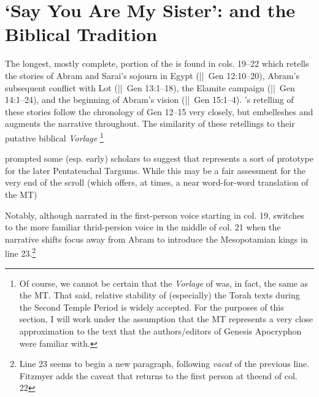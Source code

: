 \section{`Say You Are My Sister': \ga and the Biblical Tradition}

The longest, mostly complete, portion of the \ga is found in cols. 19--22 which retells the stories of Abram and Sarai's sojourn in Egypt (||~Gen 12:10--20), Abram's subsequent conflict with Lot (||~Gen 13:1--18), the Elamite campaign (||~Gen 14:1--24), and the beginning of Abram's vision (||~Gen 15:1--4). \ga's retelling of these stories follow the chronology of Gen 12--15 very closely, but \ga embelleshes and augments the narrative throughout. The similarity of these retellings to their putative biblical \emph{Vorlage}%
%
\footnote{Of course, we cannot be certain that the \emph{Vorlage} of \ga was, in fact, the same as the MT. That said, relative stability of (especially) the Torah texts during the Second Temple Period is widely accepted. For the purposes of this section, I will work under the assumption that the MT represents a very close approximation to the text that the authors/editors of Genesis Apocryphon were familiar with.}

prompted some (esp. early) scholars to suggest that \ga represents a sort of prototype for the later Pentateuchal Targums.\autocite[193]{black1983} While this may be a fair assessment for the very end of the scroll (which offers, at times, a near word-for-word translation of the MT)

Notably, although narrated in the first-person voice starting in col. 19, \ga switches to the more familiar thrid-persion voice in the middle of col. 21 when the narrative shifts focus away from Abram to introduce the Mesopotamian kings in line 23.\footnote{Line 23 seems to begin a new paragraph, following \emph{vacat} of the previous line. Fitzmyer adds the caveat that \ga returns to the first person at theend of col. 22}




